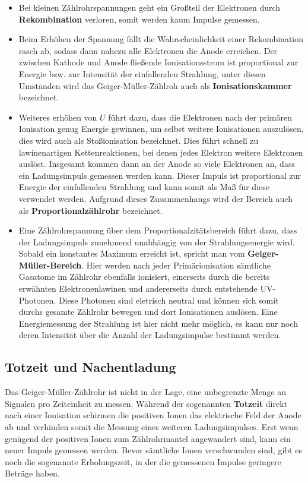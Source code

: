 \begin{itemize}
\item Bei kleinen Zählrohrspannungen geht ein Großteil der Elektronen durch \textbf{Rekombination} verloren, somit
werden kaum Impulse gemessen.
\item Beim Erhöhen der Spannung fällt die Wahrscheinlichkeit einer Rekombination rasch ab,
sodass dann nahezu alle Elektronen die Anode erreichen. Der zwischen Kathode und Anode fließende
Ionisationsstrom ist proportional zur Energie bzw. zur Intensität der einfallenden Strahlung, unter diesen Umständen
wird das Geiger-Müller-Zählroh auch als \textbf{Ionisationskammer} bezeichnet.
\item Weiteres erhöhen von $U$ führt dazu, dass die Elektronen nach der primären Ionisation genug Energie gewinnen,
um selbst weitere Ionisationen auszulösen, dies wird auch als Stoßionisation bezeichnet. Dies führt schnell zu
lawinenartigen Kettenreaktionen, bei denen jedes Elektron weitere Elektronen auslöst. Insgesamt kommen dann
an der Anode so viele Elektronen an, dass ein Ladungsimpuls gemessen werden kann. Dieser Impuls ist proportional
zur Energie der einfallenden Strahlung und kann somit als Maß für diese verwendet werden. Aufgrund dieses Zusammenhangs
wird der Bereich auch als \textbf{Proportionalzählrohr} bezeichnet.
\item Eine Zählrohrspannung über dem Proportionalzitätsbereich führt dazu, dass der Ladungsimpuls zunehmend unabhängig von der
Strahlungsenergie wird. Sobald ein konstantes Maximum erreicht ist, spricht man vom \textbf{Geiger-Müller-Bereich}.
Hier werden nach jeder Primärionisation sämtliche Gasatome im Zählrohr ebenfalls ionisiert, einerseits durch die bereits erwähnten
Elektronenlawinen und andererseits durch entstehende UV-Photonen. Diese Photonen sind eletrisch neutral und können sich somit durchs
gesamte Zählrohr bewegen und dort Ionisationen auslösen.
Eine Energiemessung der Strahlung ist hier nicht mehr möglich, es kann nur noch deren Intensität über die
Anzahl der Ladungsimpulse bestimmt werden.
\end{itemize}

\subsection{Totzeit und Nachentladung}
Das Geiger-Müller-Zählrohr ist nicht in der Lage, eine unbegrenzte Menge an Signalen pro Zeiteinheit zu messen.
Während der sogenannten \textbf{Totzeit} direkt nach einer Ionisation schirmen die positiven Ionen das elektrische Feld der Anode ab
und verhinden somit die Messung eines weiteren Ladungsimpulses.
Erst wenn genügend der positiven Ionen zum Zählrohrmantel angewandert sind, kann ein neuer Impuls gemessen werden.
Bevor sämtliche Ionen verschwunden sind, gibt es noch die sogenannte Erholungszeit, in der die gemessenen Impulse
geringere Beträge haben.

